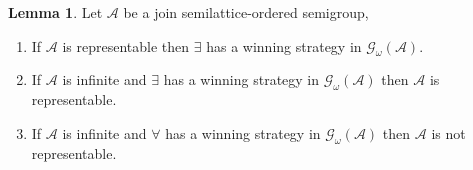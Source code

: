 \documentclass[a4paper]{article}
\theoremstyle{definition}
\theoremstyle{theorem}
\theoremstyle{proposition}
\theoremstyle{lemma}
\newtheorem{lemma}{Lemma}
\theoremstyle{ex}
\theoremstyle{corollary}
\theoremstyle{claim}
\begin{document}
\begin{lemma} Let $\mathcal{A}$ be a join semilattice-ordered semigroup,

  \begin{enumerate}
    \item If $\mathcal{A}$ is representable then $\exists$ has a winning strategy in $\mathcal{G}_{\omega}(\mathcal{A})$.
    \item If $\mathcal{A}$ is infinite and $\exists$ has a winning strategy in $\mathcal{G}_{\omega}(\mathcal{A})$ then $\mathcal{A}$ is representable.
    \item If $\mathcal{A}$ is infinite and $\forall$ has a winning strategy in $\mathcal{G}_{\omega}(\mathcal{A})$ then $\mathcal{A}$ is not representable.
  \end{enumerate}
\end{lemma}
\end{document}
